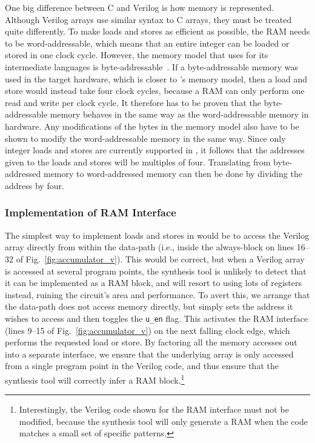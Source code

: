 One big difference between C and Verilog is how memory is represented.  Although
Verilog arrays use similar syntax to C arrays, they must be treated quite
differently. To make loads and stores as efficient as possible, the RAM needs to
be word-addressable, which means that an entire integer can be loaded or stored
in one clock cycle.  However, the memory model that \compcert{} uses for its
intermediate languages is
byte-addre\-ssa\-ble~\cite{blazy05_formal_verif_memor_model_c}.  If a
byte-addressable memory was used in the target hardware, which is closer to
\compcert{}'s memory model, then a load and store would instead take four clock
cycles, because a RAM can only perform one read and write per clock cycle.  It
therefore has to be proven that the byte-addressable memory behaves in the same
way as the word-addressable memory in hardware.  Any modifications of the bytes
in the \compcert{} memory model also have to be shown to modify the
word-addressable memory in the same way.  Since only integer loads and stores
are currently supported in \vericert{}, it follows that the addresses given to
the loads and stores will be multiples of four.  Translating from byte-addressed
memory to word-addressed memory can then be done by dividing the address by
four.

\subsubsection{Implementation of RAM Interface}\label{sec:algorithm:optimisation:ram}
The simplest way to implement loads and stores in \vericert{} would be to access
the Verilog array directly from within the data-path (i.e., inside the
always-block on lines 16--32 of Fig.~\ref{fig:accumulator_v}). This would be
correct, but when a Verilog array is accessed at several program points, the
synthesis tool is unlikely to detect that it can be implemented as a RAM block,
and will resort to using lots of registers instead, ruining the circuit's area
and performance.  To avert this, we arrange that the data-path does not access
memory directly, but simply sets the address it wishes to access and then
toggles the \texttt{u\_en} flag. This activates the RAM interface (lines 9--15
of Fig.~\ref{fig:accumulator_v}) on the next falling clock edge, which performs
the requested load or store. By factoring all the memory accesses out into a
separate interface, we ensure that the underlying array is only accessed from a
single program point in the Verilog code, and thus ensure that the synthesis
tool will correctly infer a RAM block.\footnote{Interestingly, the Verilog code
  shown for the RAM interface must not be modified, because the synthesis tool
  will only generate a RAM when the code matches a small set of specific
  patterns.}

